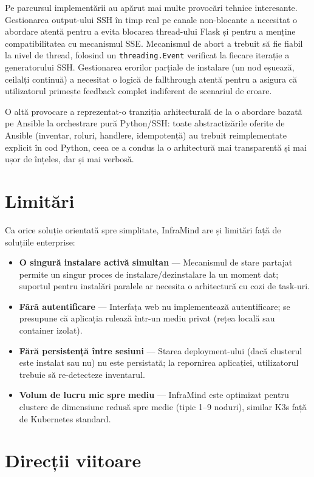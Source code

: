 \documentclass[12pt,a4paper]{report}
\begin{document}
Pe parcursul implementării au apărut mai multe provocări tehnice interesante. Gestionarea output-ului SSH în timp real pe canale non-blocante a necesitat o abordare atentă pentru a evita blocarea thread-ului Flask și pentru a menține compatibilitatea cu mecanismul SSE. Mecanismul de abort a trebuit să fie fiabil la nivel de thread, folosind un \texttt{threading.Event} verificat la fiecare iterație a generatorului SSH. Gestionarea erorilor parțiale de instalare (un nod eșuează, ceilalți continuă) a necesitat o logică de fallthrough atentă pentru a asigura că utilizatorul primește feedback complet indiferent de scenariul de eroare.

O altă provocare a reprezentat-o tranziția arhitecturală de la o abordare bazată pe Ansible la orchestrare pură Python/SSH: toate abstractizările oferite de Ansible (inventar, roluri, handlere, idempotență) au trebuit reimplementate explicit în cod Python, ceea ce a condus la o arhitectură mai transparentă și mai ușor de înțeles, dar și mai verbosă.

\section*{Limitări}

Ca orice soluție orientată spre simplitate, InfraMind are și limitări față de soluțiile enterprise:

\begin{itemize}
  \item \textbf{O singură instalare activă simultan} — Mecanismul de stare partajat permite un singur proces de instalare/dezinstalare la un moment dat; suportul pentru instalări paralele ar necesita o arhitectură cu cozi de task-uri.
  \item \textbf{Fără autentificare} — Interfața web nu implementează autentificare; se presupune că aplicația rulează într-un mediu privat (rețea locală sau container izolat).
  \item \textbf{Fără persistență între sesiuni} — Starea deployment-ului (dacă clusterul este instalat sau nu) nu este persistată; la repornirea aplicației, utilizatorul trebuie să re-detecteze inventarul.
  \item \textbf{Volum de lucru mic spre mediu} — InfraMind este optimizat pentru clustere de dimensiune redusă spre medie (tipic 1--9 noduri), similar K3s față de Kubernetes standard.
\end{itemize}

\section*{Direcții viitoare}
\end{document}

